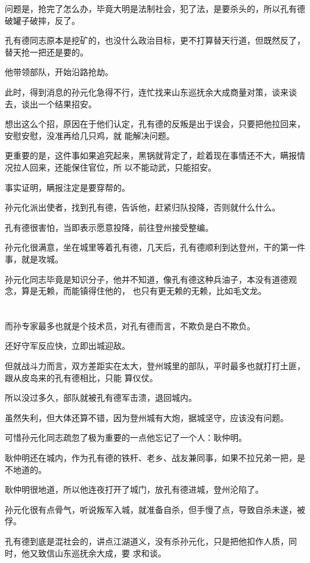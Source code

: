 \documentclass[11pt,a4paper,onecolumn]{article}
\begin{document}
问题是，抢完了怎么办，毕竟大明是法制社会，犯了法，是要杀头的，所以孔有德破罐子破摔，反了。

孔有德同志原本是挖矿的，也没什么政治目标，更不打算替天行道，但既然反了，替天抢一把还是要的。

他带领部队，开始沿路抢劫。

此时，得到消息的孙元化急得不行，连忙找来山东巡抚余大成商量对策，谈来谈去，谈出一个结果\myrule 招安。

想出这么个招，原因在于他们认定，孔有德的反叛是出于误会，只要把他拉回来，安慰安慰，没准再给几只鸡，就
能解决问题。

更重要的是，这件事如果追究起来，黑锅就背定了，趁着现在事情还不大，瞒报情况拉人回来，还能保住官位，所
以不能动武，只能招安。

事实证明，瞒报注定是要穿帮的。

孙元化派出使者，找到孔有德，告诉他，赶紧归队投降，否则就什么什么。

孔有德很害怕，当即表示愿意投降，前往登州接受整编。

孙元化很满意，坐在城里等着孔有德，几天后，孔有德顺利到达登州，干的第一件事，就是攻城。

孙元化同志毕竟是知识分子，他并不知道，像孔有德这种兵油子，本没有道德观念，算是无赖，而能镇得住他的，
也只有更无赖的无赖，比如毛文龙。

\section[\thesection]{}

而孙专家最多也就是个技术员，对孔有德而言，不欺负是白不欺负。

还好守军反应快，立即出城迎敌。

但就战斗力而言，双方差距实在太大，登州城里的部队，平时最多也就打打土匪，跟从皮岛来的孔有德相比，只能
算仪仗。

所以没过多久，部队就被孔有德军击溃，退回城内。

虽然失利，但大体还算不错，因为登州城有大炮，据城坚守，应该没有问题。

可惜孙元化同志疏忽了极为重要的一点\myrule 他忘记了一个人：耿仲明。

耿仲明还在城内，作为孔有德的铁杆、老乡、战友兼同事，如果不拉兄弟一把，是不地道的。

耿仲明很地道，所以他连夜打开了城门，放孔有德进城，登州沦陷了。

孙元化很有点骨气，听说叛军入城，就准备自杀，但手慢了点，导致自杀未遂，被俘。

孔有德到底是混社会的，讲点江湖道义，没有杀孙元化，只是把他扣作人质，同时，他又致信山东巡抚余大成，要
求和谈。
\end{document}
